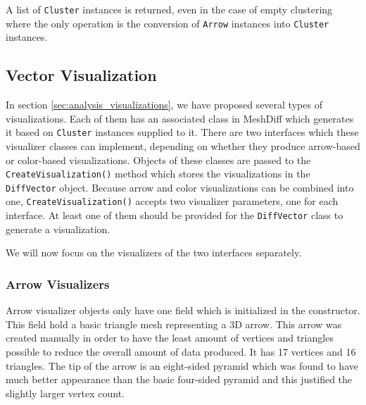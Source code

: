 A list of \verb+Cluster+ instances is returned, even in the case of empty clustering where the only operation is the conversion of \verb+Arrow+ instances into \verb+Cluster+ instances.

\subsection{Vector Visualization}
\label{sec:implementation_visualizers}

In section \ref{sec:analysis_visualizations}, we have proposed several types of visualizations. Each of them has an associated class in MeshDiff which generates it based on \verb+Cluster+ instances supplied to it. There are two interfaces which these visualizer classes can implement, depending on whether they produce arrow-based or color-based visualizations. Objects of these classes are passed to the \verb+CreateVisualization()+ method which stores the visualizations in the \verb+DiffVector+ object. Because arrow and color visualizations can be combined into one, \verb+CreateVisualization()+ accepts two visualizer parameters, one for each interface. At least one of them should be provided for the \verb+DiffVector+ class to generate a visualization.

We will now focus on the visualizers of the two interfaces separately.

\subsubsection{Arrow Visualizers}

Arrow visualizer objects only have one field which is initialized in the constructor. This field hold a basic triangle mesh representing a 3D arrow. This arrow was created manually in order to have the least amount of vertices and triangles possible to reduce the overall amount of data produced. It has 17 vertices and 16 triangles. The tip of the arrow is an eight-sided pyramid which was found to have much better appearance than the basic four-sided pyramid and this justified the slightly larger vertex count.

